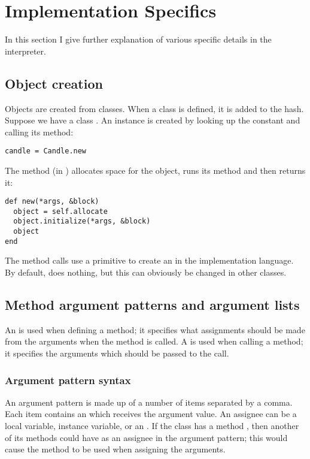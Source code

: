 \section{Implementation Specifics}

In this section I give further explanation of various specific details in the interpreter.

\subsection{Object creation}

Objects are created from classes. When a class is defined, it is added to the  hash. Suppose we have a class . An instance is created by looking up the  constant and calling its  method:

\begin{lstlisting}
candle = Candle.new
\end{lstlisting}

The  method (in ) allocates space for the object, runs its  method and then returns it:

\begin{lstlisting}
def new(*args, &block)
  object = self.allocate
  object.initialize(*args, &block)
  object
end
\end{lstlisting}

The  method calls use a primitive to create an  in the implementation language. By default,  does nothing, but this can obviously be changed in other classes.

\subsection{Method argument patterns and argument lists}

An  is used when defining a method; it specifies what assignments should be made from the arguments when the method is called. A  is used when calling a method; it specifies the arguments which should be passed to the call.

\subsubsection{Argument pattern syntax}

An argument pattern is made up of a number of items separated by a comma. Each item contains an  which receives the argument value. An assignee can be a local variable, instance variable, or an . If the class has a method , then another of its methods could have  as an assignee in the argument pattern; this would cause the  method to be used when assigning the arguments.

